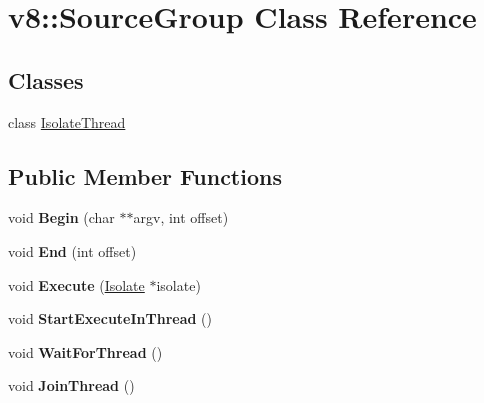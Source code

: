 \hypertarget{classv8_1_1_source_group}{}\section{v8\+:\+:Source\+Group Class Reference}
\label{classv8_1_1_source_group}
\subsection*{Classes}
\begin{DoxyCompactItemize}
\item 
class \hyperlink{classv8_1_1_source_group_1_1_isolate_thread}{Isolate\+Thread}
\end{DoxyCompactItemize}
\subsection*{Public Member Functions}
\begin{DoxyCompactItemize}
\item 
void {\bfseries Begin} (char $\ast$$\ast$argv, int offset)\hypertarget{classv8_1_1_source_group_a1a4522bd45001d3ee6d4b31547e78783}{}\label{classv8_1_1_source_group_a1a4522bd45001d3ee6d4b31547e78783}

\item 
void {\bfseries End} (int offset)\hypertarget{classv8_1_1_source_group_a6381d03bcd46b18c3099c3b56a86abae}{}\label{classv8_1_1_source_group_a6381d03bcd46b18c3099c3b56a86abae}

\item 
void {\bfseries Execute} (\hyperlink{classv8_1_1_isolate}{Isolate} $\ast$isolate)\hypertarget{classv8_1_1_source_group_a4d63b7ea2799affcb6df9922535db149}{}\label{classv8_1_1_source_group_a4d63b7ea2799affcb6df9922535db149}

\item 
void {\bfseries Start\+Execute\+In\+Thread} ()\hypertarget{classv8_1_1_source_group_a6e6a61155ca7c4553a363ce22e755eae}{}\label{classv8_1_1_source_group_a6e6a61155ca7c4553a363ce22e755eae}

\item 
void {\bfseries Wait\+For\+Thread} ()\hypertarget{classv8_1_1_source_group_ab30c676f1939def5c34fa8640ba96172}{}\label{classv8_1_1_source_group_ab30c676f1939def5c34fa8640ba96172}

\item 
void {\bfseries Join\+Thread} ()\hypertarget{classv8_1_1_source_group_ac0a4f991ca3daddf06cd5309c002716a}{}\label{classv8_1_1_source_group_ac0a4f991ca3daddf06cd5309c002716a}

\end{DoxyCompactItemize}

